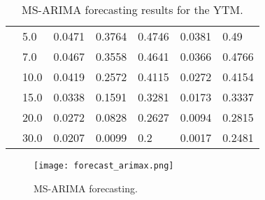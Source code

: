 \begin{table}[htbp]
\begin{tabular}{|l|l|l|l|l|l|l|}
                        &5.0&0.0471&0.3764&0.4746&0.0381&0.49\\ \cline{2-7}
                        &7.0&0.0467&0.3558&0.4641&0.0366&0.4766\\ \cline{2-7}
                        &10.0&0.0419&0.2572&0.4115&0.0272&0.4154\\ \cline{2-7}
                        &15.0&0.0338&0.1591&0.3281&0.0173&0.3337\\ \cline{2-7}
                        &20.0&0.0272&0.0828&0.2627&0.0094&0.2815\\ \cline{2-7}
                        &30.0&0.0207&0.0099&0.2&0.0017&0.2481\\ \hline
        \end{tabular}
        \caption{MS-ARIMA forecasting results for the YTM.}
        \label{tab:structuralARIMAX}
    \end{table}


    \begin{figure}[htbp]
        \texttt{[image: forecast\_arimax.png]}
        \caption{MS-ARIMA forecasting.}
        \label{fig:arimax:forecast}
    \end{figure}